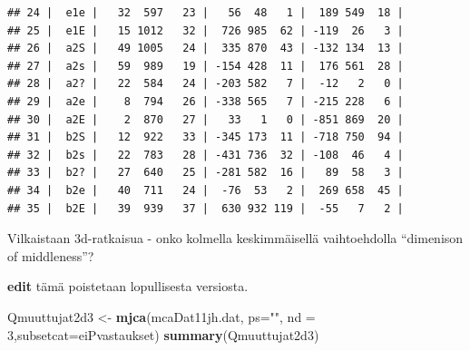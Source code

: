 \documentclass[
  finnish,
]{book}
\newenvironment{Shaded}{\begin{snugshade}}{\end{snugshade}}
\newcommand{\DataTypeTok}[1]{\textcolor[rgb]{0.13,0.29,0.53}{#1}}
\newcommand{\DecValTok}[1]{\textcolor[rgb]{0.00,0.00,0.81}{#1}}
\newcommand{\KeywordTok}[1]{\textcolor[rgb]{0.13,0.29,0.53}{\textbf{#1}}}
\newcommand{\NormalTok}[1]{#1}
\newcommand{\StringTok}[1]{\textcolor[rgb]{0.31,0.60,0.02}{#1}}
\begin{document}
\begin{verbatim}
## 24 |  e1e |   32  597   23 |   56  48   1 |  189 549  18 |
## 25 |  e1E |   15 1012   32 |  726 985  62 | -119  26   3 |
## 26 |  a2S |   49 1005   24 |  335 870  43 | -132 134  13 |
## 27 |  a2s |   59  989   19 | -154 428  11 |  176 561  28 |
## 28 |  a2? |   22  584   24 | -203 582   7 |  -12   2   0 |
## 29 |  a2e |    8  794   26 | -338 565   7 | -215 228   6 |
## 30 |  a2E |    2  870   27 |   33   1   0 | -851 869  20 |
## 31 |  b2S |   12  922   33 | -345 173  11 | -718 750  94 |
## 32 |  b2s |   22  783   28 | -431 736  32 | -108  46   4 |
## 33 |  b2? |   27  640   25 | -281 582  16 |   89  58   3 |
## 34 |  b2e |   40  711   24 |  -76  53   2 |  269 658  45 |
## 35 |  b2E |   39  939   37 |  630 932 119 |  -55   7   2 |
\end{verbatim}

Vilkaistaan 3d-ratkaisua - onko kolmella keskimmäisellä vaihtoehdolla ``dimenison
of middleness''?

\textbf{edit} tämä poistetaan lopullisesta versiosta.

\begin{Shaded}
\begin{Highlighting}[]
\NormalTok{Qmuuttujat2d3  <-}\StringTok{ }\KeywordTok{mjca}\NormalTok{(mcaDat11jh.dat, }\DataTypeTok{ps=}\StringTok{""}\NormalTok{, }\DataTypeTok{nd =} \DecValTok{3}\NormalTok{,}\DataTypeTok{subsetcat=}\NormalTok{eiPvastaukset)}
\KeywordTok{summary}\NormalTok{(Qmuuttujat2d3)}
\end{Highlighting}
\end{Shaded}
\end{document}
